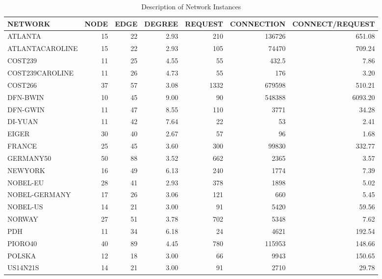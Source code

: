\begin{table}[h]
\centering
\begin{tabular}{lrrrrrr}
\toprule
NETWORK & NODE & EDGE & DEGREE & REQUEST & CONNECTION & CONNECT/REQUEST \\
\midrule
ATLANTA         & 15 & 22 & 2.93 & 210  & 136726 & 651.08  \\
ATLANTACAROLINE & 15 & 22 & 2.93 & 105  & 74470  & 709.24  \\
COST239         & 11 & 25 & 4.55 & 55   & 432.5  & 7.86    \\
COST239CAROLINE & 11 & 26 & 4.73 & 55   & 176    & 3.20    \\
COST266         & 37 & 57 & 3.08 & 1332 & 679598 & 510.21  \\
DFN-BWIN        & 10 & 45 & 9.00 & 90   & 548388 & 6093.20 \\
DFN-GWIN        & 11 & 47 & 8.55 & 110  & 3771   & 34.28   \\
DI-YUAN         & 11 & 42 & 7.64 & 22   & 53     & 2.41    \\
EIGER           & 30 & 40 & 2.67 & 57   & 96     & 1.68    \\
FRANCE          & 25 & 45 & 3.60 & 300  & 99830  & 332.77  \\
GERMANY50       & 50 & 88 & 3.52 & 662  & 2365   & 3.57    \\
NEWYORK         & 16 & 49 & 6.13 & 240  & 1774   & 7.39    \\
NOBEL-EU        & 28 & 41 & 2.93 & 378  & 1898   & 5.02    \\
NOBEL-GERMANY   & 17 & 26 & 3.06 & 121  & 660    & 5.45    \\
NOBEL-US        & 14 & 21 & 3.00 & 91   & 5420   & 59.56   \\
NORWAY          & 27 & 51 & 3.78 & 702  & 5348   & 7.62    \\
PDH             & 11 & 34 & 6.18 & 24   & 4621   & 192.54  \\
PIORO40         & 40 & 89 & 4.45 & 780  & 115953 & 148.66  \\
POLSKA          & 12 & 18 & 3.00 & 66   & 9943   & 150.65  \\
US14N21S        & 14 & 21 & 3.00 & 91   & 2710   & 29.78   \\
\bottomrule
\end{tabular}
\caption{Description of Network Instances}
\label{tab:instances}
\end{table}
